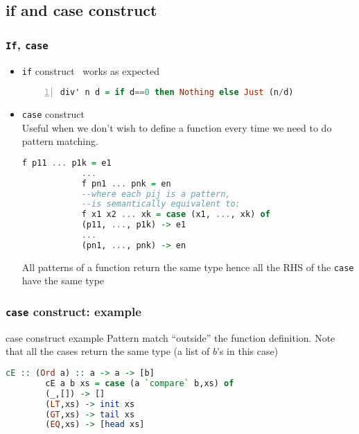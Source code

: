 	\subsection{if and case construct}
		\begin{frame}[fragile]\frametitle{\texttt{If}, \texttt{case}}
		\begin{itemize}
			\item \texttt{if} construct \
			works as expected
			\begin{lstlisting}[language=Haskell,basicstyle=\footnotesize\ttfamily,numbers=left]
			div' n d = if d==0 then Nothing else Just (n/d)
			\end{lstlisting}

			\item \texttt{case} construct \\
			 Useful when we don't wish to define a function every time we need to
			 do pattern matching.
			 
			\begin{lstlisting}[language=Haskell,basicstyle=\footnotesize\ttfamily]
			f p11 ... p1k = e1
			...
			f pn1 ... pnk = en
			--where each pij is a pattern, 
			--is semantically equivalent to:
			f x1 x2 ... xk = case (x1, ..., xk) of
			(p11, ..., p1k) -> e1
			...
			(pn1, ..., pnk) -> en
			\end{lstlisting}
			All patterns of a function return the same type hence all the RHS of the
			\texttt{case} have the same type
	
		\end{itemize}
	\end{frame}
	
	\begin{frame}[fragile]\frametitle{\texttt{case} construct: example}
		\begin{exampleblock}{case construct example}
		Pattern match ``outside'' the function definition. Note that all the cases
		return the same type (a list of $b$'s in this case)
		\begin{lstlisting}[language=Haskell,basicstyle=\footnotesize\ttfamily] 
		cE :: (Ord a) :: a -> a -> [b]
		cE a b xs = case (a `compare` b,xs) of
        (_,[]) -> []
        (LT,xs) -> init xs
        (GT,xs) -> tail xs
        (EQ,xs) -> [head xs]
				
			\end{lstlisting}
		\end{exampleblock}
	\end{frame}
	
